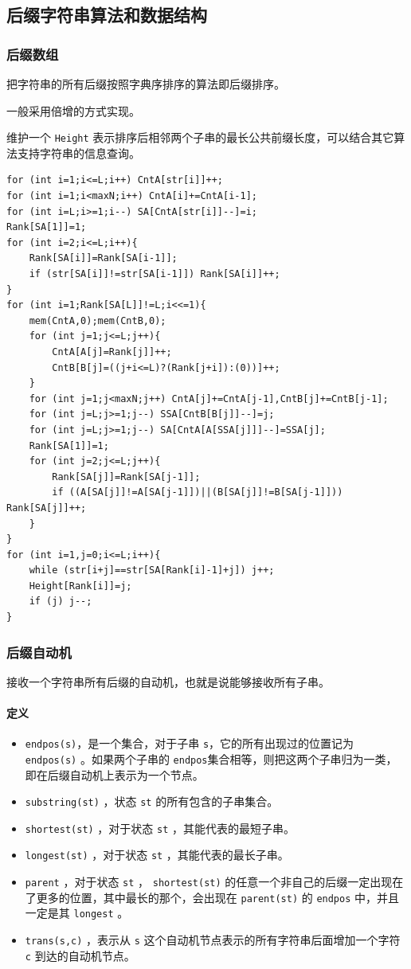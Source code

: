\documentclass[UTF-8]{ctexart}
\begin{document}
	\subsection{后缀字符串算法和数据结构}
	\subsubsection{后缀数组}
	把字符串的所有后缀按照字典序排序的算法即后缀排序。
	
	一般采用倍增的方式实现。
	
	维护一个 \texttt{Height} 表示排序后相邻两个子串的最长公共前缀长度，可以结合其它算法支持字符串的信息查询。
\begin{verbatim}
for (int i=1;i<=L;i++) CntA[str[i]]++;
for (int i=1;i<maxN;i++) CntA[i]+=CntA[i-1];
for (int i=L;i>=1;i--) SA[CntA[str[i]]--]=i;
Rank[SA[1]]=1;
for (int i=2;i<=L;i++){
    Rank[SA[i]]=Rank[SA[i-1]];
    if (str[SA[i]]!=str[SA[i-1]]) Rank[SA[i]]++; 
}
for (int i=1;Rank[SA[L]]!=L;i<<=1){
    mem(CntA,0);mem(CntB,0);
    for (int j=1;j<=L;j++){
        CntA[A[j]=Rank[j]]++;
        CntB[B[j]=((j+i<=L)?(Rank[j+i]):(0))]++;
    }
    for (int j=1;j<maxN;j++) CntA[j]+=CntA[j-1],CntB[j]+=CntB[j-1];
    for (int j=L;j>=1;j--) SSA[CntB[B[j]]--]=j;
    for (int j=L;j>=1;j--) SA[CntA[A[SSA[j]]]--]=SSA[j];
    Rank[SA[1]]=1;
    for (int j=2;j<=L;j++){
        Rank[SA[j]]=Rank[SA[j-1]];
        if ((A[SA[j]]!=A[SA[j-1]])||(B[SA[j]]!=B[SA[j-1]])) Rank[SA[j]]++;
    }
}
for (int i=1,j=0;i<=L;i++){
    while (str[i+j]==str[SA[Rank[i]-1]+j]) j++;
    Height[Rank[i]]=j;
    if (j) j--;
}
\end{verbatim}
	\subsubsection{后缀自动机}
	接收一个字符串所有后缀的自动机，也就是说能够接收所有子串。
	
	\paragraph{定义}
	
	\begin{itemize}
		\item \texttt{endpos(s)}，是一个集合，对于子串 \texttt{s}，它的所有出现过的位置记为 \texttt{endpos(s)} 。如果两个子串的 \texttt{endpos}集合相等，则把这两个子串归为一类，即在后缀自动机上表示为一个节点。  
		\item  \texttt{substring(st)} ，状态 \texttt{st} 的所有包含的子串集合。
		\item  \texttt{shortest(st)} ，对于状态 \texttt{st} ，其能代表的最短子串。  
		\item  \texttt{longest(st)} ，对于状态 \texttt{st} ，其能代表的最长子串。  
		\item  \texttt{parent} ，对于状态 \texttt{st} ， \texttt{shortest(st)} 的任意一个非自己的后缀一定出现在了更多的位置，其中最长的那个，会出现在 \texttt{parent(st)} 的 \texttt{endpos} 中，并且一定是其 \texttt{longest} 。 
		\item  \texttt{trans(s,c)} ，表示从  \texttt{s} 这个自动机节点表示的所有字符串后面增加一个字符  \texttt{c} 到达的自动机节点。
	\end{itemize}
	
\end{document}
